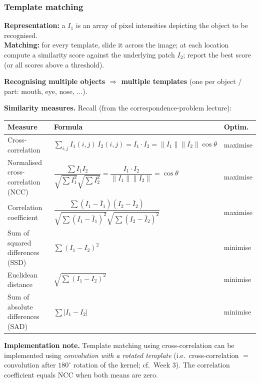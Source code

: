 \bigseparator

\subsubsection{Template matching}

\begin{defbox}
\textbf{Representation:} a  $I_1$ is an array of pixel intensities depicting the object to be recognised. \\
\textbf{Matching:} for every template, slide it across the image; at each location compute a similarity score against the underlying patch $I_2$; report the best score (or all scores above a threshold).
\end{defbox}

\textbf{Recognising multiple objects $\Rightarrow$ multiple templates} (one per object / part: mouth, eye, nose, $\ldots$).

\separator

\textbf{Similarity measures.} Recall (from the correspondence-problem lecture):

\begin{center}
\renewcommand{\arraystretch}{1.3}
\begin{tabular}{@{} l l l @{}}
\toprule
\textbf{Measure} & \textbf{Formula} & \textbf{Optim.} \\
\midrule
Cross-correlation & $\sum_{i,j} I_1(i,j)\, I_2(i,j) = I_1 \cdot I_2 = \|I_1\|\|I_2\|\cos\theta$ & maximise \\
Normalised cross-correlation (NCC) & $\dfrac{\sum I_1 I_2}{\sqrt{\sum I_1^2}\sqrt{\sum I_2^2}} = \dfrac{I_1\cdot I_2}{\|I_1\|\|I_2\|} = \cos\theta$ & maximise \\
Correlation coefficient & $\dfrac{\sum (I_1-\bar I_1)(I_2-\bar I_2)}{\sqrt{\sum (I_1-\bar I_1)^2}\sqrt{\sum (I_2-\bar I_2)^2}}$ & maximise \\
Sum of squared differences (SSD) & $\sum (I_1 - I_2)^2$ & minimise \\
Euclidean distance & $\sqrt{\sum (I_1 - I_2)^2}$ & minimise \\
Sum of absolute differences (SAD) & $\sum |I_1 - I_2|$ & minimise \\
\bottomrule
\end{tabular}
\end{center}

\textbf{Implementation note.} Template matching using cross-correlation can be implemented using \emph{convolution with a rotated template} (i.e.\ cross-correlation $=$ convolution after $180^\circ$ rotation of the kernel; cf.\ Week 3). The correlation coefficient equals NCC when both means are zero.

